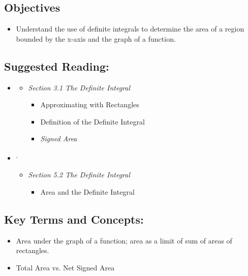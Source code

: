 
\vspace{-0.25 in}
\begin{framed}
\subsection*{Objectives}
\begin{itemize}
    \item Understand the use of definite integrals to determine the area of a region bounded by the x-axis and the graph of a function.
\end{itemize}

\subsection*{Suggested Reading:}
\begin{itemize}
\item \cite{Calaway}\footnotemark[1]
   \begin{itemize}
        \item \emph{Section 3.1 The Definite Integral}
        \begin{itemize}
            \item Approximating with Rectangles
            \item Definition of the Definite Integral
            \item \emph{Signed Area}
        \end{itemize}
    \end{itemize}
\item \cite{openstax}\footnotemark[2]\textsuperscript{,}\footnotemark[3]
    \begin{itemize}
        \item \emph{Section 5.2 The Definite Integral}
        \begin{itemize}
            \item Area and the Definite Integral
        \end{itemize}
    \end{itemize}
\end{itemize}
\subsection*{Key Terms and Concepts:} 


\begin{itemize}
    \item Area under the graph of a function; area as a limit of sum of areas of rectangles.
    \item Total Area vs. Net Signed Area
\end{itemize}

\end{framed}
